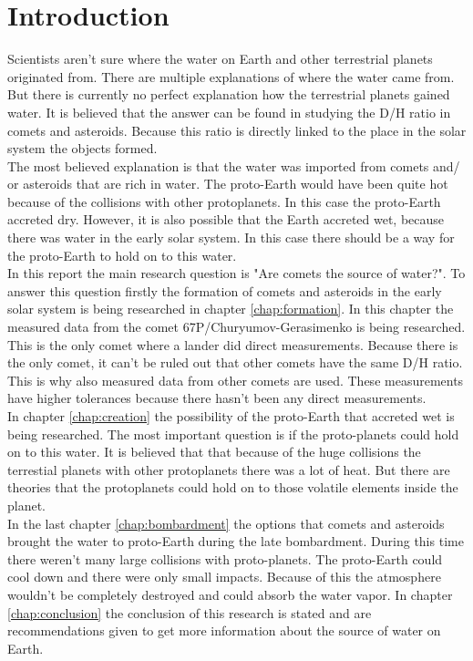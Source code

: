 
\section{Introduction}
Scientists aren't sure where the water on Earth and other terrestrial planets originated from. There are multiple explanations of where the water came from. But there is currently no perfect explanation how the terrestrial planets gained water. It is believed that the answer can be found in studying the D/H ratio in comets and asteroids. Because this ratio is directly linked to the place in the solar system the objects formed.\\

The most believed explanation is that the water was imported from comets and/ or asteroids that are rich in water. The proto-Earth would have been quite hot because of the collisions with other protoplanets. In this case the proto-Earth accreted dry. However, it is also possible that the Earth accreted wet, because there was water in the early solar system. In this case there should be a way for the proto-Earth to hold on to this water.\\

In this report the main research question is "Are comets the source of water?". To answer this question firstly the formation of comets and asteroids in the early solar system is being researched in chapter \ref{chap:formation}. In this chapter the measured data from the comet 67P/Churyumov-Gerasimenko is being researched. This is the only comet where a lander did direct measurements. Because there is the only comet, it can't be ruled out that other comets have the same D/H ratio. This is why also measured data from other comets are used. These measurements have higher tolerances because there hasn't been any direct measurements.\\

In chapter \ref{chap:creation} the possibility of the proto-Earth that accreted wet is being researched. The most important question is if the proto-planets could hold on to this water. It is believed that that because of the huge collisions the terrestial planets with other protoplanets there was a lot of heat. But there are theories that the protoplanets could hold on to those volatile elements inside the planet. \\

In the last chapter \ref{chap:bombardment} the options that comets and asteroids brought the water to proto-Earth during the late bombardment. During this time there weren't many large collisions with proto-planets. The proto-Earth could cool down and there were only small impacts. Because of this the atmosphere wouldn't be completely destroyed and could absorb the water vapor. In chapter \ref{chap:conclusion} the conclusion of this research is stated and are recommendations given to get more information about the source of water on Earth.\\ 


